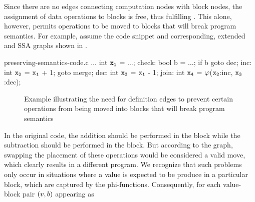 Since there are no \glspl{edge} connecting \glspl{computation node} with
\glspl{block node}, the assignment of data \glspl{operation} to \glspl{block} is
free, thus fulfilling .
%
This alone, however, permits \glspl{operation} to be moved to \glspl{block} that
will break \gls{program} semantics.
%
For example, assume the code snippet and corresponding, extended
 and \glspl{SSA graph} shown in
.
%
\begin{filecontents*}{preserving-semantics-code.c}
  $\ldots$
  int $\irVar{x}[1]$ = $\ldots$;
check:
  bool b = $\ldots$;
  if b goto dec;
inc:
  int $\irVar{x}[2]$ = $\irVar{x}[1]$ + 1;
  goto merge;
dec:
  int $\irVar{x}[3]$ = $\irVar{x}[1]$ - 1;
join:
  int $\irVar{x}[4]$ = $\mPhi$($\irVar{x}[2]$:inc, $\irVar{x}[3]$:dec);
\end{filecontents*}
%
\begin{figure}
  \centering

  \mbox{}%
  \hfill%
  \hfill\hfill\hfill%
  \hfill%
  \mbox{}

  \caption[Example illustrating the need for definition edges]%
          {%
            Example illustrating the need for definition edges to prevent
            certain operations from being moved into blocks that will break
            program semantics%
          }
\end{figure}
%
In the original code, the addition should be performed in the 
\gls{block} while the subtraction should be performed in the 
\gls{block}.
%
But according to the \gls{graph}, swapping the placement of these
\glspl{operation} would be considered a valid move, which clearly results in a
different \gls{program}.
%
We recognize that such problems only occur in situations where a value is
expected to be produce in a particular \gls{block}, which are captured by the
\glspl{phi-function}.
%
Consequently, for each value-\gls{block} pair \mbox{$\mPair{v}{b}$} appearing as
